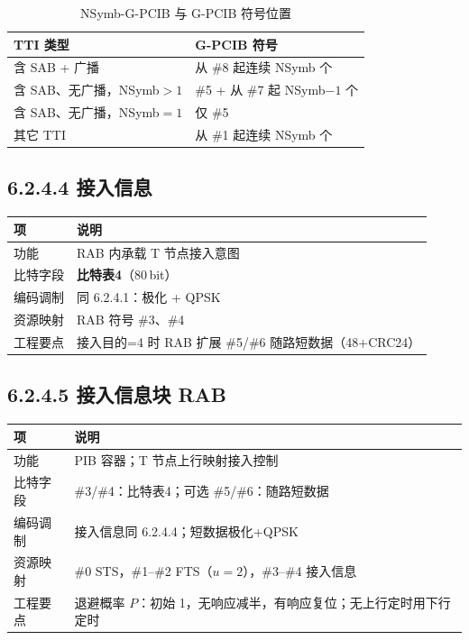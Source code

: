 \documentclass[11pt,a4paper]{ctexart}
\begin{document}
\begin{table}[h]
\centering
\small
\caption{NSymb-G-PCIB 与 G-PCIB 符号位置}
\begin{tabular}{ll}
\toprule
\textbf{TTI 类型} & \textbf{G-PCIB 符号} \\
\midrule
含 SAB + 广播 & 从 \#8 起连续 NSymb 个 \\
含 SAB、无广播，NSymb$>1$ & \#5 + 从 \#7 起 NSymb$-1$ 个 \\
含 SAB、无广播，NSymb$=1$ & 仅 \#5 \\
其它 TTI & 从 \#1 起连续 NSymb 个 \\
\bottomrule
\end{tabular}
\end{table}

\subsection{6.2.4.4 接入信息}

\begin{table}[h]
\centering
\small
\begin{tabular}{L{2.2cm}L{10.8cm}}
\toprule
\textbf{项} & \textbf{说明} \\
\midrule
功能 & RAB 内承载 T 节点接入意图 \\
比特字段 & \textbf{比特表4}（80\,bit） \\
编码调制 & 同 6.2.4.1：极化 + QPSK \\
资源映射 & RAB 符号 \#3、\#4 \\
工程要点 & 接入目的=4 时 RAB 扩展 \#5/\#6 随路短数据（48+CRC24） \\
\bottomrule
\end{tabular}
\end{table}

\subsection{6.2.4.5 接入信息块 RAB}

\begin{table}[h]
\centering
\small
\begin{tabular}{L{2.2cm}L{10.8cm}}
\toprule
\textbf{项} & \textbf{说明} \\
\midrule
功能 & PIB 容器；T 节点上行映射接入控制 \\
比特字段 & \#3/\#4：比特表4；可选 \#5/\#6：随路短数据 \\
编码调制 & 接入信息同 6.2.4.4；短数据极化+QPSK \\
资源映射 & \#0 STS，\#1--\#2 FTS（$u{=}2$），\#3--\#4 接入信息 \\
工程要点 & 退避概率 $P$：初始 1，无响应减半，有响应复位；无上行定时用下行定时 \\
\bottomrule
\end{tabular}
\end{table}
\end{document}
